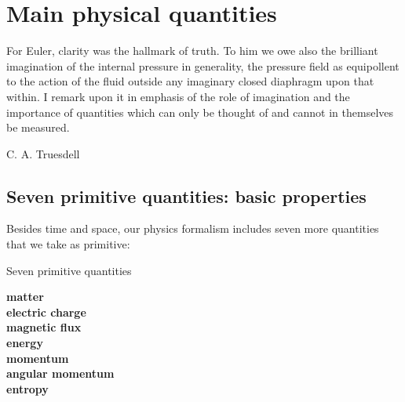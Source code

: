 \documentclass[a4paper,12pt,%
onecolumn,oneside,titlepage,%
british%
]{memoir}
\renewcommand*{\|}[1][]{\nonscript\:#1\vert\nonscript\:\mathopen{}}
\begin{document}
%
%
%
%





\printpagenotes*
\clearpage
\chapter{Main physical quantities}
\label{cha:stuff}

\epigraph{For Euler, clarity was the hallmark of truth. \textelp{} To him we owe also the brilliant imagination of the internal pressure in generality, the pressure field as equipollent to the action of the fluid outside any imaginary closed diaphragm upon that within. \textelp{} I remark upon it in emphasis of the role of imagination and the importance of quantities which can only be thought of and cannot in themselves be measured.}{C. A. Truesdell \cites*{truesdell1956d}}



\section[Seven primitive quantities]{Seven primitive quantities: basic properties}
\label{sec:stuff}

Besides time and space, our physics formalism includes seven more quantities that we take as primitive:
\begin{definition}{Seven primitive quantities}
  \begin{center}\bfseries
    matter
    \\ electric charge
    \\ magnetic flux
    \\ energy
    \\ momentum
    \\ angular momentum
    \\ entropy
  \end{center}
\end{definition}
\end{document}
